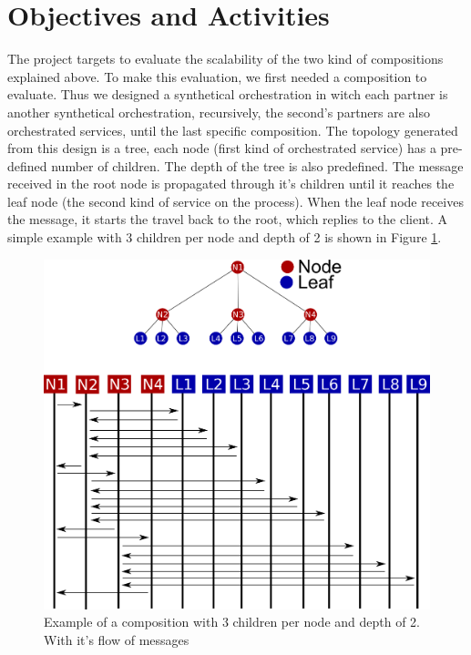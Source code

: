 \section{Objectives and Activities}

The project targets to evaluate the scalability of the two kind of compositions explained above. To make this evaluation, we first needed a composition to evaluate. Thus we designed a synthetical orchestration in witch each partner is another synthetical orchestration, recursively, the second's partners are also orchestrated services, until the last specific composition. The topology generated from this design is a tree, each node (first kind of orchestrated service) has a pre-defined number of children. The depth of the tree is also predefined. The message received in the root node is propagated through it's children until it reaches the leaf node (the second kind of service on the process). When the leaf node receives the message, it starts the travel back to the root, which replies to the client. A simple example with 3 children per node and depth of 2 is shown in Figure \ref{synthetical-example}.

\begin{figure}[htb]
	\centering
	\includegraphics[width=\textwidth]{images/synthetical-example}
	\caption{Example of a composition with 3 children per node and depth of 2. With it's flow of messages}
	\label{synthetical-example}
\end{figure}
\newpage

